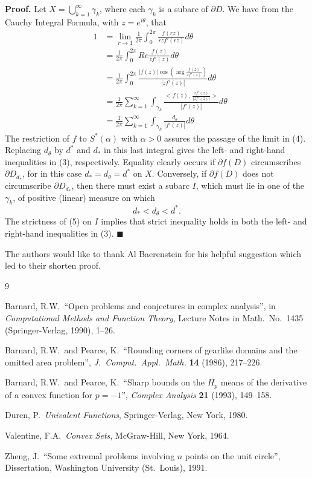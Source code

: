 {\bf Proof.} Let $X=\bigcup^\infty_{k=1}\gamma_k$, where each
$\gamma_k$ is a subarc of $\partial D$.  We have from the Cauchy
Integral Formula, with $z=e^{i\theta}$, that
\begin{eqnarray}
\nonumber
& 1 & =\lim_{r\rightarrow 1}\frac{1}{2\pi}\int^{2\pi}_0  
\frac{f(rz)}{rzf'(rz)}d\theta\\[2ex]
\nonumber
&& =\frac{1}{2\pi}\int^{2\pi}_0{Re}\frac{f(z)}{zf'(z)}
d\theta\\[2ex]
\label{eq:4}
&& =\frac{1}{2\pi}\int^{2\pi}_0\frac{|f(z)|\cos
(\arg\frac{f(z)}{zf'(z)})}{|zf'(z)|}d\theta\\[2ex]
\nonumber
&& =\frac{1}{2\pi}\sum^\infty_{k=1}\int_{\gamma_k}
\frac{<f(z),\:\frac{zf'(z)}{|zf'(z)|}>}{|f'(z)|}d\theta\\[2ex]
\nonumber
&& =\frac{1}{2\pi}\sum^\infty_{k=1}\int_{\gamma_k}
\frac{d_\theta}{|f'(z)|}d\theta
\end{eqnarray}
The restriction of $f$ to $S^\ast(\alpha)$ with $\alpha>0$ assures
the passage of the limit in (4).  Replacing $d_\theta$ by $d^\ast$ and
$d_\ast$ in this last integral gives the left- and right-hand
inequalities in (3), respectively.  Equality clearly occurs if
$\partial f(D)$ circumscribes $\partial D_{d_\ast}$, for in this case
$d_\ast=d_\theta=d^\ast$ on $X$.  Conversely, if $\partial f(D)$ does not
circumscribe $\partial D_{d_\ast}$, then there must exist a subarc $I$,
which must lie in one of the $\gamma_k$, of positive (linear) measure
on which 
\begin{equation}
\label{eq:5}
d_\ast<d_\theta<d^\ast.
\end{equation} 
The strictness of (5) on $I$ implies that strict inequality holds in
both the left- and right-hand inequalities in (3).  $\blacksquare$

The authors would like to thank Al Baerenstein for his helpful
suggestion which led to their shorten proof.


\begin{thebibliography}{9}

  Barnard, R.W.\ ``Open problems and conjectures in
complex analysis'', in {\em Computational Methods and Function
Theory}, Lecture Notes in Math.\ No.\ 1435 (Springer-Verlag, 1990),
1--26.

  Barnard, R.W.\ and Pearce, K.\ ``Rounding corners of
gearlike domains and the omitted area problem'', {\em J.\ Comput.\
Appl.\ Math.} {\bf 14} (1986), 217--226.

  Barnard, R.W.\ and Pearce, K.\ ``Sharp bounds on the
$H_p$ means of the derivative of a convex function for $p=-1$'', {\em
Complex Analysis} {\bf 21} (1993), 149--158.

  Duren, P.\ {\em Univalent Functions}, Springer-Verlag,
New York, 1980.

  Valentine, F.A.\ {\em Convex Sets}, McGraw-Hill, New
York, 1964.

  Zheng, J.\ ``Some extremal problems involving $n$ points
on the unit circle'', Dissertation, Washington University (St.\
Louis), 1991.

\end{thebibliography}

 
